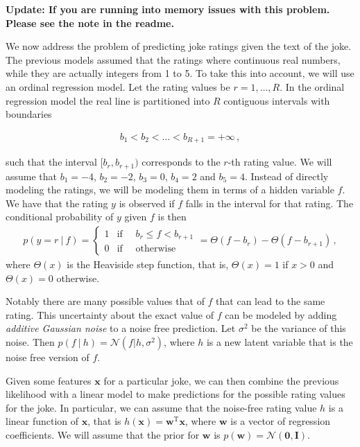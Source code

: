 \documentclass[submit]{harvardml}
\theoremstyle{plain}
\begin{document}
\textbf{Update: If you are running into memory issues with this problem. Please see the note in the
readme.}


We now address the problem of predicting joke ratings given the text of the
joke. The previous models assumed that the ratings where continuous real
numbers, while they are actually integers from 1 to 5. To take this into
account, we will use an ordinal regression model.
Let the rating values
be $r = 1,\ldots,R$. In the ordinal regression model the real line is
partitioned into $R$ contiguous intervals with boundaries

\begin{align}
b_1 < b_2 < \ldots < b_{R+1} = +\infty\,,
\end{align}

\noindent such that the interval $[b_r,b_{r+1})$ corresponds to the $r$-th rating value.
We will assume that $b_1 = -4$, $b_2 = -2$, $b_3 = 0$, $b_4 = 2$ and $b_5 = 4$.
Instead of directly modeling the ratings, we will be modeling them in terms of a
hidden variable $f$. We have that the rating $y$ is observed
if $f$ falls in the interval for that rating. The conditional probability of
$y$ given $f$ is then
\begin{align}
p(y = r\ |\ f) =
\left\{
    \begin{array}{ll}
        1  & \mbox{if }\quad  b_r \leq f < b_{r+1} \\
        0 & \mbox{if } \quad \mbox{otherwise}
    \end{array}
\right.
= \Theta(f - b_r) - \Theta(f-b_{r+1})\,,
\end{align}
where $\Theta(x)$ is the Heaviside step function, that is, $\Theta(x)=1$ if
$x>0$ and $\Theta(x)=0$ otherwise.


Notably there are many possible values that of $f$ that can lead to
the same rating.  This uncertainty about the exact value of $f$ can be
modeled by adding \textit{additive Gaussian noise} to a noise free
prediction. Let $\sigma^2$ be the variance of this noise. Then
$p(f\ |\ h) = \mathcal{N}(f|h,\sigma^2)$, where $h$ is a new latent
variable that is the noise free version of $f$.

Given some features $\mathbf{x}$ for a particular joke, we can then combine the
previous likelihood with a linear model to make predictions for the possible
rating values for the joke. In particular, we can assume that the noise-free
rating value $h$ is a linear function of $\mathbf{x}$, that is
$h(\mathbf{x})=\mathbf{w}^\text{T} \mathbf{x}$, where $\mathbf{w}$ is a vector
of regression coefficients. We will assume that the prior for $\mathbf{w}$ is
$p(\mathbf{w})=\mathcal{N}(\bm 0, \mathbf{I})$.
\end{document}
